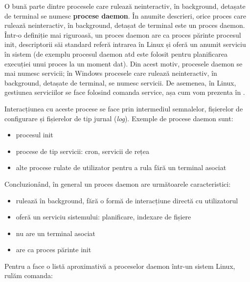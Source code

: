 O bună parte dintre procesele care rulează neinteractiv, în background, detașate
de terminal se numesc \textbf{procese daemon}. În anumite descrieri, orice proces care
rulează neinteractiv, în background, detașat de terminal este un proces daemon.
Într-o definiție mai riguroasă, un proces daemon are ca proces părinte procesul
init, descriptorii săi standard referă intrarea  în Linux și oferă un
anumit serviciu în sistem (de exemplu procesul daemon atd este folosit pentru
planificarea execuției unui proces la un moment dat). Din acest motiv, procesele
daemon se mai numesc servicii; în Windows procesele care rulează neinteractiv,
în background, detașate de terminal, se numesc servicii. De asemenea, în Linux,
gestiunea serviciilor se face folosind comanda service, așa cum vom prezenta în
.

Interacțiunea cu aceste procese se face prin intermediul semnalelor, fișierelor
de configurare și fișierelor de tip jurnal (\textit{log}). Exemple de procese daemon
sunt:

\begin{itemize}
	\item procesul init
	\item procese de tip servicii: cron, servicii de rețea
	\item alte procese rulate de utilizator pentru a rula fără un terminal
		asociat
\end{itemize}

Concluzionând, în general un proces daemon are următoarele caracteristici:

\begin{itemize}
	\item rulează în background, fără o formă de interacțiune directă cu
		utilizatorul
	\item oferă un serviciu sistemului: planificare, indexare de fișiere
	\item nu are un terminal asociat
	\item are ca proces părinte init
\end{itemize}

Pentru a face o listă aproximativă a proceselor daemon într-un sistem Linux, rulăm comanda:


